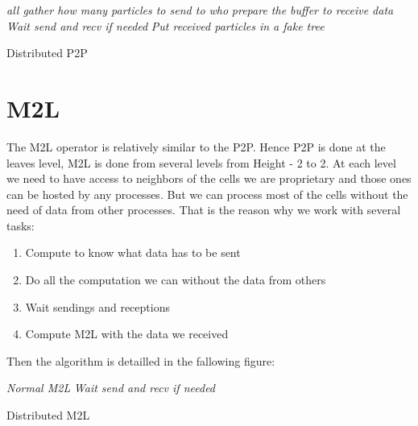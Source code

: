 \documentclass[10pt,letterpaper,titlepage]{report}
\begin{document}
\begin{algorithm}[H]
\SetLine
{}
\BlankLine

\emph{all gather how many particles to send to who}\;
\emph{prepare the buffer to receive data}\;
\emph{Wait send and recv if needed}\;
\emph{Put received particles in a fake tree}\;

\BlankLine
\caption{Distributed P2P}
\end{algorithm}


\section{M2L}
The M2L operator is relatively similar to the P2P.
Hence P2P is done at the leaves level, M2L is done from several levels from Height - 2 to 2.
At each level we need to have access to neighbors of the cells we are proprietary and those ones can be hosted by any processes.
But we can process most of the cells without the need of data from other processes.
That is the reason why we work with several tasks:
\begin{enumerate}
\item Compute to know what data has to be sent
\item Do all the computation we can without the data from others
\item Wait sendings and receptions
\item Compute M2L with the data we received
\end{enumerate}

Then the algorithm is detailled in the fallowing figure:

\begin{algorithm}[H]
\SetLine
{}
\BlankLine
{}
\emph{Normal M2L}\;
\emph{Wait send and recv if needed}\;
\BlankLine
\caption{Distributed M2L}
\end{algorithm}
\end{document}

